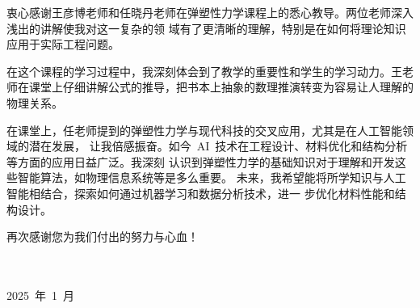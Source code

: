 衷心感谢王彦博老师和任晓丹老师在弹塑性力学课程上的悉心教导。两位老师深入浅出的讲解使我对这一复杂的领
域有了更清晰的理解，特别是在如何将理论知识应用于实际工程问题。

在这个课程的学习过程中，我深刻体会到了教学的重要性和学生的学习动力。王老师在课堂上仔细讲解公式的推导，把书本上抽象的数理推演转变为容易让人理解的物理关系。

在课堂上，任老师提到的弹塑性力学与现代科技的交叉应用，尤其是在人工智能领域的潜在发展，
让我倍感振奋。如今~AI~技术在工程设计、材料优化和结构分析等方面的应用日益广泛。我深刻
认识到弹塑性力学的基础知识对于理解和开发这些智能算法，如物理信息系统等是多么重要。
未来，我希望能将所学知识与人工智能相结合，探索如何通过机器学习和数据分析技术，进一
步优化材料性能和结构设计。


再次感谢您为我们付出的努力与心血！
\\
\\
\\
\begin{flushright}
2025~年~1~月
\end{flushright}